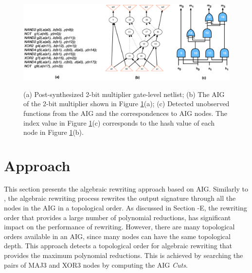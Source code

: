\begin{figure}[t] 
\begin{center}
\includegraphics[scale=0.30]{../figs/aig-to-gatenetlist.eps}
\caption{(a) Post-synthesized 2-bit multiplier gate-level netlist; (b) The AIG of the 2-bit multiplier shown in Figure \ref{fig:2-bit-mult-aig}(a); (c) Detected unobserved functions from the AIG and the correspondences to AIG nodes. The index value in Figure \ref{fig:2-bit-mult-aig}(c) corresponds to the hash value of each node in Figure \ref{fig:2-bit-mult-aig}(b). }
\vspace{-3mm}
\label{fig:2-bit-mult-aig}
\end{center}
\end{figure}

\section{Approach} \label{sec:approach}

This section presents the algebraic rewriting approach based on AIG. Similarly to \cite{ciesielski2015verification}, the algebraic rewriting process rewrites the output signature through all the nodes in the AIG in a topological order. As discussed in Section -E, the rewriting order that provides a large number of polynomial reductions, has significant impact on the performance of rewriting. However, there are many topological orders available in an AIG, since many nodes can have the same topological depth. This approach detects a topological order for algebraic rewriting that provides the maximum polynomial reductions. This is achieved by searching the pairs of MAJ3 and XOR3 nodes by computing the AIG \textit{Cuts}. 

